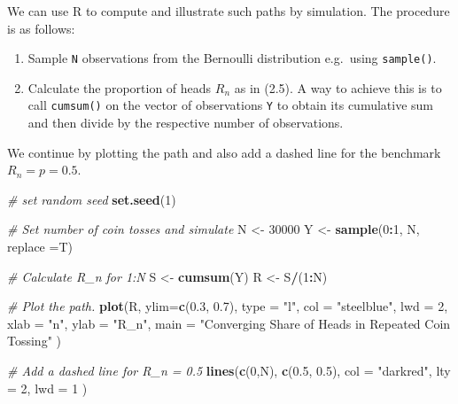\documentclass[]{book}
\newenvironment{Shaded}{\begin{snugshade}}{\end{snugshade}}
\newcommand{\KeywordTok}[1]{\textcolor[rgb]{0.13,0.29,0.53}{\textbf{#1}}}
\newcommand{\DataTypeTok}[1]{\textcolor[rgb]{0.13,0.29,0.53}{#1}}
\newcommand{\DecValTok}[1]{\textcolor[rgb]{0.00,0.00,0.81}{#1}}
\newcommand{\FloatTok}[1]{\textcolor[rgb]{0.00,0.00,0.81}{#1}}
\newcommand{\StringTok}[1]{\textcolor[rgb]{0.31,0.60,0.02}{#1}}
\newcommand{\CommentTok}[1]{\textcolor[rgb]{0.56,0.35,0.01}{\textit{#1}}}
\newcommand{\OperatorTok}[1]{\textcolor[rgb]{0.81,0.36,0.00}{\textbf{#1}}}
\newcommand{\NormalTok}[1]{#1}
\providecommand{\tightlist}{%
  \setlength{\itemsep}{0pt}\setlength{\parskip}{0pt}}
\theoremstyle{definition}
\theoremstyle{definition}
\theoremstyle{definition}
\theoremstyle{remark}
\begin{document}
We can use R to compute and illustrate such paths by simulation. The
procedure is as follows:

\begin{enumerate}
\def\labelenumi{\arabic{enumi}.}
\tightlist
\item
  Sample \texttt{N} observations from the Bernoulli distribution
  e.g.~using \texttt{sample()}.
\item
  Calculate the proportion of heads \(R_n\) as in (2.5). A way to
  achieve this is to call \texttt{cumsum()} on the vector of
  observations \texttt{Y} to obtain its cumulative sum and then divide
  by the respective number of observations.
\end{enumerate}

We continue by plotting the path and also add a dashed line for the
benchmark \(R_n = p = 0.5\).

\begin{Shaded}
\begin{Highlighting}[]
\CommentTok{# set random seed}
\KeywordTok{set.seed}\NormalTok{(}\DecValTok{1}\NormalTok{)}

\CommentTok{# Set number of coin tosses and simulate}
\NormalTok{N <-}\StringTok{ }\DecValTok{30000}
\NormalTok{Y <-}\StringTok{ }\KeywordTok{sample}\NormalTok{(}\DecValTok{0}\OperatorTok{:}\DecValTok{1}\NormalTok{, N, }\DataTypeTok{replace =}\NormalTok{T)}

\CommentTok{# Calculate R_n for 1:N}
\NormalTok{S <-}\StringTok{ }\KeywordTok{cumsum}\NormalTok{(Y)}
\NormalTok{R <-}\StringTok{ }\NormalTok{S}\OperatorTok{/}\NormalTok{(}\DecValTok{1}\OperatorTok{:}\NormalTok{N)}

\CommentTok{# Plot the path.}
\KeywordTok{plot}\NormalTok{(R, }
     \DataTypeTok{ylim=}\KeywordTok{c}\NormalTok{(}\FloatTok{0.3}\NormalTok{, }\FloatTok{0.7}\NormalTok{), }
     \DataTypeTok{type =} \StringTok{"l"}\NormalTok{, }
     \DataTypeTok{col =} \StringTok{"steelblue"}\NormalTok{, }
     \DataTypeTok{lwd =} \DecValTok{2}\NormalTok{, }
     \DataTypeTok{xlab =} \StringTok{"n"}\NormalTok{, }
     \DataTypeTok{ylab =} \StringTok{"R_n"}\NormalTok{,}
     \DataTypeTok{main =} \StringTok{"Converging Share of Heads in Repeated Coin Tossing"}
\NormalTok{     )}

\CommentTok{# Add a dashed line for R_n = 0.5}
\KeywordTok{lines}\NormalTok{(}\KeywordTok{c}\NormalTok{(}\DecValTok{0}\NormalTok{,N), }
      \KeywordTok{c}\NormalTok{(}\FloatTok{0.5}\NormalTok{, }\FloatTok{0.5}\NormalTok{), }
      \DataTypeTok{col =} \StringTok{"darkred"}\NormalTok{, }
      \DataTypeTok{lty =} \DecValTok{2}\NormalTok{, }
      \DataTypeTok{lwd =} \DecValTok{1}
\NormalTok{      )}
\end{Highlighting}
\end{Shaded}
\end{document}
